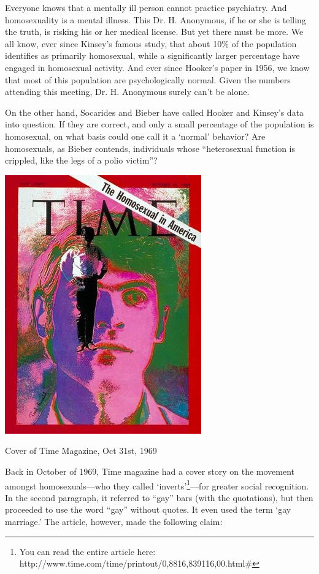 \begin{refsection}
Everyone knows that a mentally ill person cannot practice psychiatry. And homosexuality is a mental illness. This Dr. H. Anonymous, if he or she is telling the truth, is risking his or her medical license. But yet there must be more. We all know, ever since Kinsey's famous study, that about 10\% of the population identifies as primarily homosexual, while a significantly larger percentage have engaged in homosexual activity. And ever since Hooker's paper in 1956, we know that most of this population are psychologically normal. Given the numbers attending this meeting, Dr. H. Anonymous surely can't be alone.

On the other hand, Socarides and Bieber have called Hooker and Kinsey's data into question. If they are correct, and only a small percentage of the population is homosexual, on what basis could one call it a `normal' behavior? Are homosexuals, as Bieber contends, individuals whose “heterosexual function is crippled, like the legs of a polio victim”?
\begin{marginfigure}
 \begin{center}

     \includegraphics{../images/TimeCover.jpg}
\end{center}
 \caption{Cover of Time Magazine, Oct 31st, 1969}
\label{fig: time1969}
\end{marginfigure}


Back in October of 1969, Time magazine had a cover story on the movement amongst homosexuals---who they called `inverts'\footnote{You can read the entire article here: http:\slash \slash www.time.com\slash time\slash printout\slash 0,8816,839116,00.html\#}---for greater social recognition. In the second paragraph, it referred to “gay” bars (with the quotations), but then proceeded to use the word “gay” without quotes. It even used the term `gay marriage.' The article, however, made the following claim:


\end{refsection}
